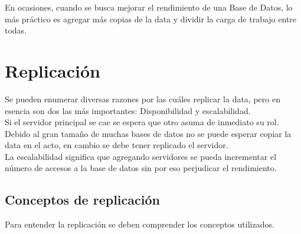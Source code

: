 En ocasiones, cuando se busca mejorar el rendimiento de una Base de Datos, lo más práctico es agregar más copias de la data y dividir la carga de trabajo entre todas.

\section{Replicación}

Se pueden enumerar diversas razones por las cuáles replicar la data, pero en esencia son dos las más importantes: Disponibilidad y escalabilidad.\\

Si el servidor principal se cae se espera que otro asuma  de inmediato su rol. Debido al gran tamaño de muchas bases de datos no se puede esperar copiar la data en el acto, en cambio se debe tener replicado el servidor.\\

La escalabilidad significa que agregando servidores se pueda incrementar el número de accesos a la base de datos sin por eso perjudicar el rendimiento.

\subsection{Conceptos de replicación}

Para entender la replicación se deben comprender los conceptos utilizados.

